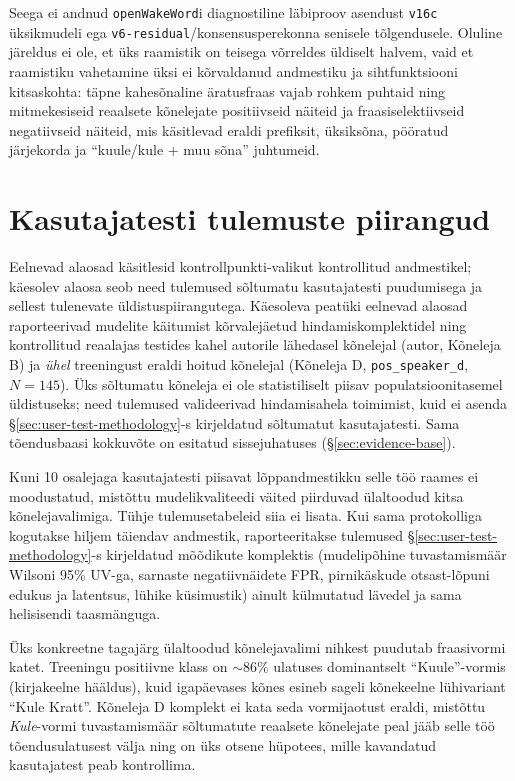 Seega ei andnud \texttt{openWakeWord}i diagnostiline läbiproov asendust \texttt{v16c} üksikmudeli ega \texttt{v6-residual}/konsensusperekonna senisele tõlgendusele. Oluline järeldus ei ole, et üks raamistik on teisega võrreldes üldiselt halvem, vaid et raamistiku vahetamine üksi ei kõrvaldanud andmestiku ja sihtfunktsiooni kitsaskohta: täpne kahesõnaline äratusfraas vajab rohkem puhtaid ning mitmekesiseid reaalsete kõnelejate positiivseid näiteid ja fraasiselektiivseid negatiivseid näiteid, mis käsitlevad eraldi prefiksit, üksiksõna, pööratud järjekorda ja \enquote{kuule/kule + muu sõna} juhtumeid.

\section{Kasutajatesti tulemuste piirangud}
\label{sec:user-test-results}

Eelnevad alaosad käsitlesid kontrollpunkti-valikut kontrollitud andmestikel; käesolev alaosa seob need tulemused sõltumatu kasutajatesti puudumisega ja sellest tulenevate üldistuspiirangutega. Käesoleva peatüki eelnevad alaosad raporteerivad mudelite käitumist kõrvalejäetud hindamiskomplektidel ning kontrollitud reaalajas testides kahel autorile lähedasel kõnelejal (autor, Kõneleja B) ja \emph{ühel} treeningust eraldi hoitud kõnelejal (Kõneleja D, \texttt{pos\_speaker\_d}, $N=145$). Üks sõltumatu kõneleja ei ole statistiliselt piisav populatsioonitasemel üldistuseks; need tulemused valideerivad hindamisahela toimimist, kuid ei asenda §\ref{sec:user-test-methodology}-s kirjeldatud sõltumatut kasutajatesti. Sama tõendusbaasi kokkuvõte on esitatud sissejuhatuses (§\ref{sec:evidence-base}).

Kuni 10 osalejaga kasutajatesti piisavat lõppandmestikku selle töö raames ei moodustatud, mistõttu mudelikvaliteedi väited piirduvad ülaltoodud kitsa kõnelejavalimiga. Tühje tulemusetabeleid siia ei lisata. Kui sama protokolliga kogutakse hiljem täiendav andmestik, raporteeritakse tulemused §\ref{sec:user-test-methodology}-s kirjeldatud mõõdikute komplektis (mudelipõhine tuvastamismäär Wilsoni 95\% UV-ga, sarnaste negatiivnäidete FPR, pirnikäskude otsast-lõpuni edukus ja latentsus, lühike küsimustik) ainult külmutatud lävedel ja sama helisisendi taasmänguga.

Üks konkreetne tagajärg ülaltoodud kõnelejavalimi nihkest puudutab fraasivormi katet. Treeningu positiivne klass on ${\sim}86\%$ ulatuses dominantselt \enquote{Kuule}-vormis (kirjakeelne hääldus), kuid igapäevases kõnes esineb sageli kõnekeelne lühivariant \enquote{Kule Kratt}. Kõneleja D komplekt ei kata seda vormijaotust eraldi, mistõttu \emph{Kule}-vormi tuvastamismäär sõltumatute reaalsete kõnelejate peal jääb selle töö tõendusulatusest välja ning on üks otsene hüpotees, mille kavandatud kasutajatest peab kontrollima.
